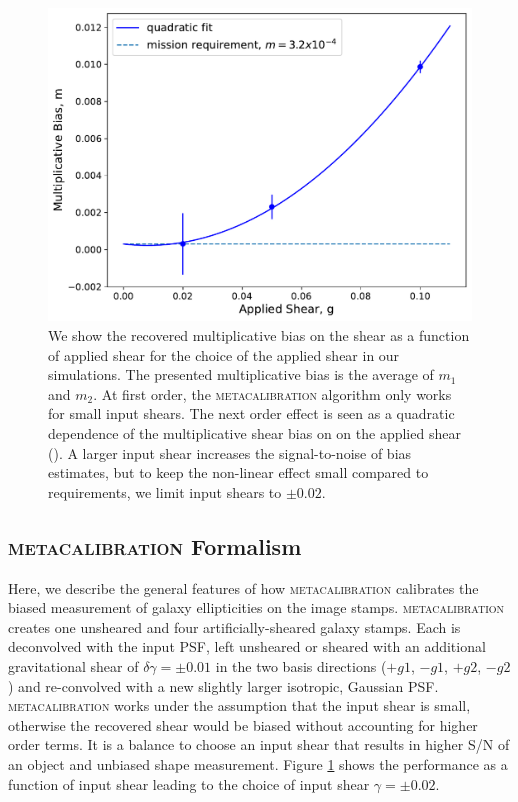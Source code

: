\documentclass[fleqn,usenatbib]{mnras}
\begin{document}
\begin{figure}
	\includegraphics[width=\columnwidth]{metacal_bias_shear.pdf}
    \caption{We show the recovered multiplicative bias on the shear as a function of applied shear for the choice of the applied shear in our simulations. The presented multiplicative bias is the average of $m_{1}$ and $m_{2}$. At first order, the \textsc{metacalibration} algorithm only works for small input shears. The next order effect is seen as a quadratic dependence of the multiplicative shear bias on on the applied shear (\citealt{2017ApJ...841...24S}). A larger input shear increases the signal-to-noise of bias estimates, but to keep the non-linear effect small compared to requirements, we limit input shears to $\pm 0.02$. }
    \label{fig:metacal_shear_linear}
\end{figure}

\subsection{\textsc{metacalibration} Formalism}
Here, we describe the general features of how \textsc{metacalibration} calibrates the biased measurement of galaxy ellipticities on the image stamps. \textsc{metacalibration} creates one unsheared and four artificially-sheared galaxy stamps. Each is deconvolved with the input PSF, left unsheared or sheared with an additional gravitational shear of $\delta\gamma=\pm 0.01$ in the two basis directions ($+g1$, $-g1$, $+g2$, $-g2$) and re-convolved with a new slightly larger isotropic, Gaussian PSF. \textsc{metacalibration} works under the assumption that the input shear is small, otherwise the recovered shear would be biased without accounting for higher order terms. It is a balance to choose an input shear that results in higher S/N of an object and unbiased shape measurement. Figure \ref{fig:metacal_shear_linear} shows the performance as a function of input shear leading to the choice of input shear $\gamma=\pm 0.02$. 
\end{document}
